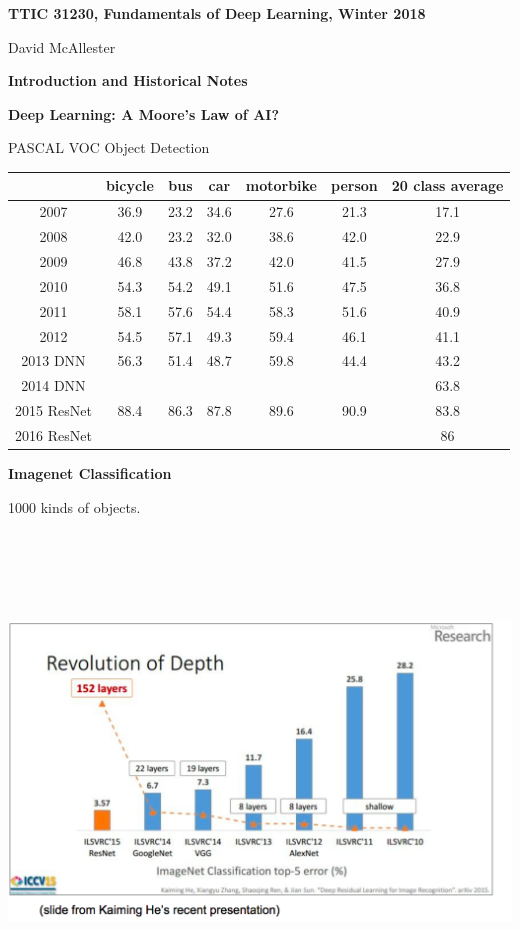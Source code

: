 \documentclass[landscape]{article}
\newcommand{\slide}[1]{\vfill
\eject
\centerline{\bf #1}
\vfill}
\begin{document}
{\huge
  \centerline{\bf TTIC 31230,  Fundamentals of Deep Learning, Winter 2018}
  \vfill
  \centerline{David McAllester}
  \vfill
  \centerline{\bf Introduction and Historical Notes}


\slide{Deep Learning: A Moore's Law of AI?}

PASCAL VOC Object Detection

\vfill

\begin{center}
\begin{tabular}{|c|c|c|c|c|c|c|}
\hline
& bicycle & bus & car & motorbike & person & 20 class average \\
\hline
2007 & 36.9 & 23.2 & 34.6 &  27.6 &  21.3 &  17.1   \\
\hline 
2008 & 42.0 & 23.2 & 32.0 & 38.6 & 42.0 & 22.9   \\
\hline
2009 & 46.8 & 43.8 & 37.2 & 42.0 & 41.5 & 27.9 \\
\hline 
2010 & 54.3 & 54.2 & 49.1 & 51.6 & 47.5 & 36.8 \\
\hline
2011 & 58.1 & 57.6 & 54.4 & 58.3 & 51.6 & 40.9 \\
\hline
2012 & 54.5 & 57.1 & 49.3 & 59.4 & 46.1 & 41.1 \\
\hline
2013 DNN & 56.3 & 51.4 & 48.7 & 59.8 & 44.4 & 43.2 \\
\hline
2014 DNN & & & & & & 63.8 \\
\hline
2015 ResNet & 88.4 & 86.3 & 87.8 & 89.6 & 90.9 & 83.8 \\
\hline
2016 ResNet & &  & &  &  & 86 \\
\hline
\end{tabular}
\end{center}

\slide{Imagenet Classification}

1000 kinds of objects.

\vfill
\centerline{\includegraphics[height=5.0in]{../images/IVLSRC}}

}
\end{document}
